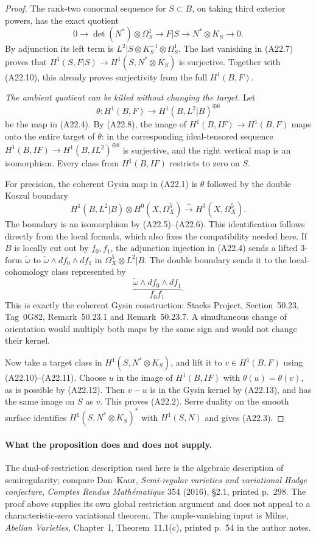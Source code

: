 \documentclass[11pt]{article}
\theoremstyle{remark}\newtheorem{remark}[theorem]{Remark}
\begin{document}
\begin{proof}
The rank-two conormal sequence for $S\subset B$, on
taking third exterior powers, has the exact quotient
\[
 0\longrightarrow\det(N^*)\otimes\Omega_S^1
       \longrightarrow F|S\longrightarrow N^*\otimes K_S
       \longrightarrow0.
 \tag{A22.11}
\]
By adjunction its left term is
$L^2|S\otimes K_S^{-1}\otimes\Omega_S^1$.
The last vanishing in (A22.7) proves that
$H^1(S,F|S)\to H^1(S,N^*\otimes K_S)$ is surjective.
Together with (A22.10), this already proves surjectivity
from the full $H^1(B,F)$.

\emph{The ambient quotient can be killed without changing the target.}
Let
\[
  \theta:H^1(B,F)\longrightarrow H^1(B,L^2|B)^{\oplus6}
 \tag{A22.12}
\]
be the map in (A22.4). By (A22.8), the image of
$H^1(B,IF)\to H^1(B,F)$ maps onto the entire target of
$\theta$: in the corresponding ideal-tensored sequence
$H^1(B,IF)\to H^1(B,IL^2)^{\oplus6}$ is surjective,
and the right vertical map is an isomorphism. Every
class from $H^1(B,IF)$ restricts to zero on $S$.

For precision, the coherent Gysin map in (A22.1) is
$\theta$ followed by the double Koszul boundary
\[
 H^1(B,L^2|B)\otimes H^0(X,\Omega_X^5)
        \xrightarrow{\sim} H^3(X,\Omega_X^5).
 \tag{A22.13}
\]
The boundary is an isomorphism by (A22.5)--(A22.6).
This identification follows directly from the local
formula, which also fixes the compatibility needed
here. If $B$ is locally cut out by $f_0,f_1$, the
adjunction injection in (A22.4) sends a lifted
$3$-form $\widetilde\omega$ to
$\widetilde\omega\wedge df_0\wedge df_1$ in
$\Omega_X^5\otimes L^2|B$. The double boundary sends it to
the local-cohomology class represented by
\[
       \frac{\widetilde\omega\wedge df_0\wedge df_1}{f_0f_1}.
 \tag{A22.14}
\]
This is exactly the coherent Gysin construction:
Stacks Project, Section~50.23, Tag~0G82, Remark~50.23.1
and Remark~50.23.7. A simultaneous change of orientation
would multiply both maps by the same sign and would
not change their kernel.

Now take a target class in $H^1(S,N^*\otimes K_S)$,
and lift it to $v\in H^1(B,F)$ using (A22.10)--(A22.11).
Choose $u$ in the image of $H^1(B,IF)$ with
$\theta(u)=\theta(v)$, as is possible by (A22.12).
Then $v-u$ is in the Gysin kernel by (A22.13), and
has the same image on $S$ as $v$. This proves (A22.2).
Serre duality on the smooth surface identifies
$H^1(S,N^*\otimes K_S)^*$ with $H^1(S,N)$ and gives
(A22.3).
\end{proof}

\paragraph{What the proposition does and does not supply.}
The dual-of-restriction description used here is the algebraic
description of semiregularity; compare Dan--Kaur,
\emph{Semi-regular varieties and variational Hodge conjecture},
\emph{Comptes Rendus Math\'ematique} 354 (2016), \S2.1,
printed p.~298. The proof above supplies its own global
restriction argument and does not appeal to a
characteristic-zero variational theorem. The ample-vanishing
input is Milne, \emph{Abelian Varieties}, Chapter~I,
Theorem~11.1(c), printed p.~54 in the author notes.
\end{document}
